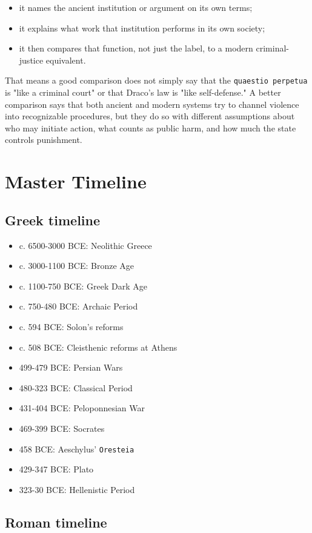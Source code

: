 \documentclass[11pt]{article}
\begin{document}
\begin{itemize}
\item it names the ancient institution or argument on its own terms;
\item it explains what work that institution performs in its own society;
\item it then compares that function, not just the label, to a modern criminal-justice equivalent.
\end{itemize}

That means a good comparison does not simply say that the \texttt{quaestio perpetua} is "like a criminal court" or that Draco's law is "like self-defense." A better comparison says that both ancient and modern systems try to channel violence into recognizable procedures, but they do so with different assumptions about who may initiate action, what counts as public harm, and how much the state controls punishment.

\section{Master Timeline}

\subsection{Greek timeline}

\begin{itemize}
\item c. 6500-3000 BCE: Neolithic Greece
\item c. 3000-1100 BCE: Bronze Age
\item c. 1100-750 BCE: Greek Dark Age
\item c. 750-480 BCE: Archaic Period
\item c. 594 BCE: Solon's reforms
\item c. 508 BCE: Cleisthenic reforms at Athens
\item 499-479 BCE: Persian Wars
\item 480-323 BCE: Classical Period
\item 431-404 BCE: Peloponnesian War
\item 469-399 BCE: Socrates
\item 458 BCE: Aeschylus' \texttt{Oresteia}
\item 429-347 BCE: Plato
\item 323-30 BCE: Hellenistic Period
\end{itemize}

\subsection{Roman timeline}
\end{document}
